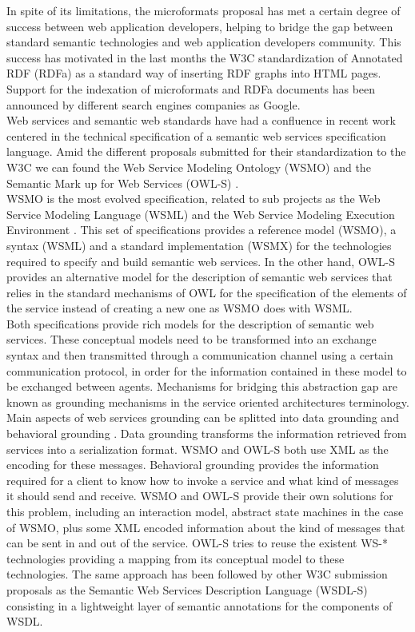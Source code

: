 In spite of its limitations, the microformats proposal has met a certain degree of success between web application
developers, helping to bridge the gap between standard semantic technologies and web application developers
community. This success has motivated in the last months the W3C standardization of Annotated RDF (RDFa)  \cite{rdfa} as
a standard way of inserting RDF graphs into HTML pages. Support for the indexation of microformats and RDFa documents has
been announced by different search engines companies as Google.\\

Web services and semantic web standards have had a confluence in recent work centered in the technical specification of a
semantic web services specification language. Amid the different proposals submitted for their standardization to the
W3C we can found the  Web Service Modeling Ontology (WSMO) \cite{wsmo} and the Semantic Mark up for Web Services (OWL-S) \cite{owls}.\\ 
WSMO is the most evolved specification, related to sub projects as the Web Service Modeling Language (WSML) \cite{wsml}
and the Web Service Modeling Execution Environment \cite{wsmx}. This set of specifications provides a reference model
(WSMO), a syntax (WSML) and a standard implementation (WSMX) for the technologies required to specify and build
semantic web services. In the other hand, OWL-S provides an alternative model for the description of semantic web
services that relies in the standard mechanisms of OWL for the specification of the elements of the service instead of
creating a new one as WSMO does with WSML. \\

Both specifications provide rich models for the description of semantic web services. These conceptual models need to
be transformed into an exchange syntax and then transmitted through a communication channel using a certain communication
protocol, in order for the information contained in these model to be exchanged between agents. Mechanisms for bridging this
abstraction gap are known as grounding mechanisms in the service oriented architectures terminology. Main aspects of web services
grounding can be splitted into data grounding and behavioral grounding \cite{ISBN:3540345191}. Data grounding
transforms the information retrieved from services into a serialization format. WSMO and OWL-S both use XML as the
encoding  for these messages. Behavioral grounding provides the information required for a client to know how to invoke
a service and what kind of messages it should send and receive. WSMO and OWL-S provide their own solutions for this
problem, including an interaction model, abstract state machines in the case of WSMO, plus some XML encoded information
about the kind of messages that can be sent in and out of the service. OWL-S tries to reuse the existent WS-*
technologies providing a mapping from its conceptual model to these technologies. The same approach has been followed by
other W3C submission proposals as the Semantic Web Services Description Language (WSDL-S) \cite{wsdls} consisting in
a lightweight layer of semantic annotations for the components of WSDL.\\

